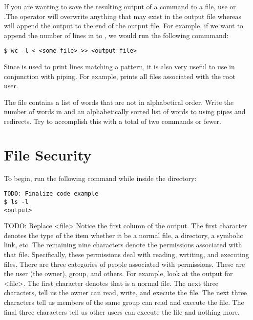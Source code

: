 If you are wanting to save the resulting output of a command to a file, use \li{>} or \li{>>}.The \li{>} operator will overwrite anything that may exist in the output file whereas \li{>>} will append the output to the end of the output file. For example, if we want to append the number of lines in  to , we would run the following commmand:

\begin{lstlisting}
$ wc -l < <some file> >> <output file> 
\end{lstlisting}

Since  is used to print lines matching a pattern, it is also very useful to use in conjunction with piping. For example,  prints all files associated with the root user.

\begin{problem}
The  file contains a list of words that are not in alphabetical order. Write the number of words in  and an alphabetically sorted list of words to  using pipes and redirects. Try to accomplish this with a total of two commands or fewer.
\end{problem}

\section*{File Security}
To begin, run the following command while inside the  directory:

\begin{lstlisting}
TODO: Finalize code example
$ ls -l 
<output>
\end{lstlisting}

TODO: Replace <file>
Notice the first column of the output. The first character denotes the type of the item whether it be a normal file, a directory, a symbolic link, etc. The remaining nine characters denote the permissions associated with that file. Specifically, these permissions deal with reading, wrtiting, and executing files. There are three categories of people associated with permissions. These are the user (the owner), group, and others. For example, look at the output for <file>. The first character \li{-} denotes that  is a normal file. The next three characters,  tell us the owner can read, write, and execute the file. The next three characters  tell us members of the same group can read and execute the file. The final three characters  tell us other users can execute the file and nothing more.

